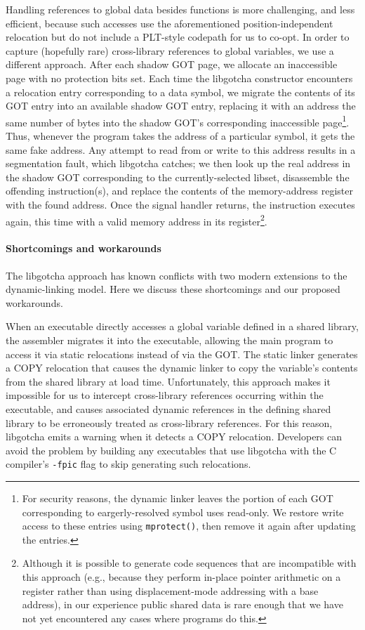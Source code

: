 Handling references to global data besides functions is more challenging, and less
efficient, because such accesses use the aforementioned position-independent
relocation but do not include a PLT-style codepath for us to co-opt.
In order to capture (hopefully rare) cross-library references to global variables,
we use a different approach.  After each shadow GOT page, we allocate an inaccessible
page with no protection bits set.  Each time the libgotcha constructor encounters a
relocation entry corresponding to a data symbol, we migrate the contents of its GOT
entry into an available shadow GOT entry, replacing it with an address the same
number of bytes into the shadow GOT's corresponding inaccessible page\footnote{For
security reasons, the dynamic linker leaves the portion of each GOT corresponding to
eargerly-resolved symbol uses read-only.  We restore write access to these entries
using \texttt{mprotect()}, then remove it again after updating the entries.}.  Thus,
whenever the program takes the address of a particular symbol, it gets the same fake
address.  Any attempt to read from or write to this address results in a segmentation
fault, which libgotcha catches; we then look up the real address in the shadow GOT
corresponding to the currently-selected libset, disassemble the offending
instruction(s), and replace the contents of the memory-address register with the
found address.  Once the signal handler returns, the instruction executes again, this
time with a valid memory address in its register\footnote{Although it is possible to
generate code sequences that are incompatible with this approach (e.g., because they
perform in-place pointer arithmetic on a register rather than using displacement-mode
addressing with a base address), in our experience public shared data is rare enough
that we have not yet encountered any cases where programs do this.}.

\paragraph{Shortcomings and workarounds}

The libgotcha approach has known conflicts with two modern extensions to the
dynamic-linking model.  Here we discuss these shortcomings and our proposed
workarounds.

When an executable directly accesses a global variable defined in a shared library,
the assembler migrates it into the executable, allowing the main program to access it
via static relocations instead of via the GOT.  The static linker generates a COPY
relocation that causes the dynamic linker to copy the variable's contents from the
shared library at load time.  Unfortunately, this approach makes
it impossible for us to intercept cross-library references occurring within the
executable, and causes associated dynamic references in the defining shared library
to be erroneously treated as cross-library references.  For this reason, libgotcha
emits a warning when it detects a COPY relocation.  Developers can avoid the problem
by building any executables that use libgotcha with the C compiler's \texttt{-fpic}
flag to skip generating such relocations.

